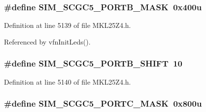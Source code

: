 \subsubsection[{\texorpdfstring{S\+I\+M\+\_\+\+S\+C\+G\+C5\+\_\+\+P\+O\+R\+T\+B\+\_\+\+M\+A\+SK}{SIM_SCGC5_PORTB_MASK}}]{\setlength{\rightskip}{0pt plus 5cm}\#define S\+I\+M\+\_\+\+S\+C\+G\+C5\+\_\+\+P\+O\+R\+T\+B\+\_\+\+M\+A\+SK~0x400u}\hypertarget{group___s_i_m___register___masks_ga5509cf72c7508dd77f0a1a9e631943e8}{}\label{group___s_i_m___register___masks_ga5509cf72c7508dd77f0a1a9e631943e8}


Definition at line 5139 of file M\+K\+L25\+Z4.\+h.



Referenced by vfn\+Init\+Leds().

\subsubsection[{\texorpdfstring{S\+I\+M\+\_\+\+S\+C\+G\+C5\+\_\+\+P\+O\+R\+T\+B\+\_\+\+S\+H\+I\+FT}{SIM_SCGC5_PORTB_SHIFT}}]{\setlength{\rightskip}{0pt plus 5cm}\#define S\+I\+M\+\_\+\+S\+C\+G\+C5\+\_\+\+P\+O\+R\+T\+B\+\_\+\+S\+H\+I\+FT~10}\hypertarget{group___s_i_m___register___masks_ga491c4800f5437a9e2d235a77819e434d}{}\label{group___s_i_m___register___masks_ga491c4800f5437a9e2d235a77819e434d}


Definition at line 5140 of file M\+K\+L25\+Z4.\+h.

\subsubsection[{\texorpdfstring{S\+I\+M\+\_\+\+S\+C\+G\+C5\+\_\+\+P\+O\+R\+T\+C\+\_\+\+M\+A\+SK}{SIM_SCGC5_PORTC_MASK}}]{\setlength{\rightskip}{0pt plus 5cm}\#define S\+I\+M\+\_\+\+S\+C\+G\+C5\+\_\+\+P\+O\+R\+T\+C\+\_\+\+M\+A\+SK~0x800u}\hypertarget{group___s_i_m___register___masks_gaac31449d101ad0d05f2bed682571be35}{}\label{group___s_i_m___register___masks_gaac31449d101ad0d05f2bed682571be35}


